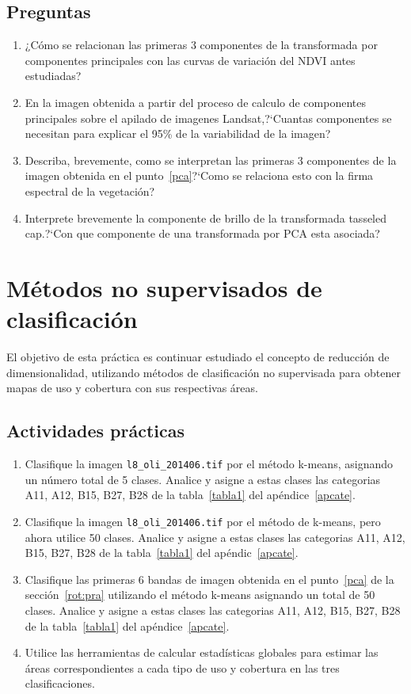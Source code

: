 \documentclass[hidelinks,12pt]{article}
\begin{document}
\subsection{Preguntas}
\begin{enumerate}
    \item ¿Cómo se relacionan las primeras 3 componentes de la transformada por
        componentes principales con las curvas de variación del NDVI antes
        estudiadas? 
    \item En la imagen obtenida a partir del proceso de calculo de componentes
        principales sobre el apilado de imagenes Landsat,?`Cuantas componentes
        se necesitan para explicar el 95\% de la variabilidad de la imagen?
    \item Describa, brevemente, como se interpretan las primeras 3 componentes
        de la imagen obtenida en el punto~\ref{pca}?`Como se relaciona esto con la
        firma espectral de la vegetaci\'on?
    \item Interprete brevemente la componente de brillo de la transformada
        tasseled cap.?`Con que componente de una transformada por PCA esta 
        asociada?
\end{enumerate}

\section{Métodos no supervisados de clasificación}

El objetivo de esta práctica es continuar estudiado el concepto de reducción de
dimensionalidad, utilizando métodos de clasificación no supervisada para obtener
mapas de uso y cobertura con sus respectivas áreas.

\subsection{Actividades pr\'acticas}
\begin{enumerate}
    \item Clasifique la imagen \texttt{l8\_oli\_2014\-06.tif} por el método 
        k-means, asignando un número total
        de 5 clases. Analice y asigne a estas clases las categorias A11, A12,
        B15, B27, B28 de la tabla~\ref{tabla1} del ap\'endice~\ref{apcate}.
    \item Clasifique la imagen \texttt{l8\_oli\_2014\-06.tif} por el método de 
        k-means, pero ahora utilice 50
        clases. Analice y asigne a estas clases las categorias A11, A12,
        B15, B27, B28 de la tabla~\ref{tabla1} del ap\'endic~\ref{apcate}.
    \item Clasifique las primeras 6 bandas de  imagen obtenida en el punto~\ref{pca} 
        de la secci\'on~\ref{rot:pra} utilizando el m\'etodo k-means
        asignando un total de 50 clases. Analice y asigne a estas clases las categorias A11, A12,
        B15, B27, B28 de la tabla~\ref{tabla1} del ap\'endice~\ref{apcate}.
    \item Utilice las herramientas de calcular estadísticas globales para
        estimar las áreas correspondientes a cada tipo de uso y cobertura en
        las tres clasificaciones.
\end{enumerate}
\end{document}
